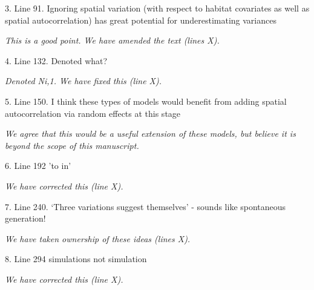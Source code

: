 \documentclass[12pt,english]{article}
\begin{document}
\begin{spacing}{1.9}
\begin{flushleft}
3. Line 91. Ignoring spatial variation (with respect to habitat covariates as well as spatial autocorrelation) has great potential for underestimating variances

\vspace{0.5cm}
\textit{This is a good point.  We have amended the text (lines X).} 
\vspace{0.5cm}

4. Line 132. Denoted what?

\vspace{0.5cm}
\textit{Denoted Ni,1.  We have fixed this (line X).}
\vspace{0.5cm}

5. Line 150. I think these types of models would benefit from adding spatial autocorrelation via random effects at this stage

\vspace{0.5cm}
\textit{We agree that this would be a useful extension of these models, but believe it is beyond the scope of this manuscript.}
\vspace{0.5cm}

6. Line 192 'to in'

\vspace{0.5cm}
\textit{We have corrected this (line X).}
\vspace{0.5cm}

7. Line 240. `Three variations suggest themselves' - sounds like spontaneous generation!

\vspace{0.5cm}
\textit{We have taken ownership of these ideas (lines X).}
\vspace{0.5cm}

8. Line 294 simulations not simulation

\vspace{0.5cm}
\textit{We have corrected this (line X).}
\vspace{0.5cm}
\end{flushleft}
\end{spacing}
\end{document}
